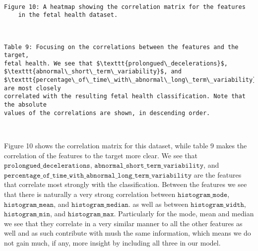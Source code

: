 \documentclass[11pt]{article}
\begin{document}
    \begin{center}
    \end{center}
    { \hspace*{\fill} \\}

 \begin{Verbatim}[commandchars=\\\{\}]
 	Figure 10: A heatmap showing the correlation matrix for the features 
 	in the fetal health dataset.
 \end{Verbatim}
 

 \hspace*{\fill} \\
    \begin{Verbatim}[commandchars=\\\{\}]
Table 9: Focusing on the correlations between the features and the target, 
fetal health. We see that $\texttt{prolongued\_decelerations}$, 
$\texttt{abnormal\_short\_term\_variability}$, and 
$\texttt{percentage\_of\_time\_with\_abnormal\_long\_term\_variability}$ are most closely 
correlated with the resulting fetal health classification. Note that the absolute 
values of the correlations are shown, in descending order.
    \end{Verbatim}

    \begin{center}
\end{center}
{ \hspace*{\fill} \\}
        
    Figure 10 shows the correlation matrix for this dataset, while table
9 makes the correlation of the features to the target more clear.
We see that \(\texttt{prolongued\_decelerations}\),
\(\texttt{abnormal\_short\_term\_variability}\), and
\(\texttt{percentage\_of\_time\_with\_abnormal\_long\_term\_variability}\) are
the features that correlate most strongly with the classification. Between the features we see that there is naturally a
very strong correlation between \(\texttt{histogram\_mode}\),
\(\texttt{histogram\_mean}\), and \(\texttt{histogram\_median}\). as well
as between \(\texttt{histogram\_width}\), \(\texttt{histogram\_min}\), and
\(\texttt{histogram\_max}\). Particularly for the mode, mean and median
we see that they correlate in a very similar manner to all the other
features as well and as such contribute with mush the same information,
which means we do not gain much, if any, more insight by including all
three in our model.
\end{document}
